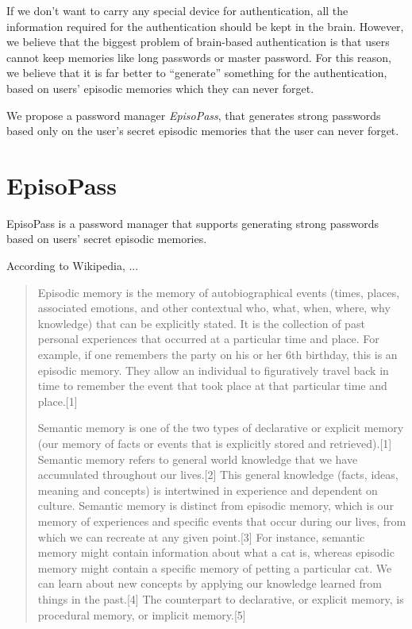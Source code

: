\documentclass{article}
\begin{document}
If we don't want to carry any special device for authentication,
all the information required for the authentication should be
kept in the brain.
%
However, we believe that the biggest problem of brain-based authentication is that
users cannot keep memories like long passwords or master password.
For this reason, we believe that
it is far better to ``generate'' something for the authentication,
based on users' episodic memories which they can never forget.


We propose a password manager \textit{EpisoPass}, that generates strong passwords
based only on the user's secret episodic memories that the user can never forget.

\section{EpisoPass}

EpisoPass is a password manager that supports generating
strong passwords based on users' secret episodic memories.
%
%

According to Wikipedia, ...

\begin{quote}
Episodic memory is the memory of autobiographical events (times,
places, associated emotions, and other contextual who, what, when,
where, why knowledge) that can be explicitly stated. It is the
collection of past personal experiences that occurred at a particular
time and place. For example, if one remembers the party on his or her
6th birthday, this is an episodic memory. They allow an individual to
figuratively travel back in time to remember the event that took place
at that particular time and place.[1]

Semantic memory is one of the two types of declarative or explicit
memory (our memory of facts or events that is explicitly stored and
retrieved).[1] Semantic memory refers to general world knowledge that
we have accumulated throughout our lives.[2] This general knowledge
(facts, ideas, meaning and concepts) is intertwined in experience and
dependent on culture. Semantic memory is distinct from episodic
memory, which is our memory of experiences and specific events that
occur during our lives, from which we can recreate at any given
point.[3] For instance, semantic memory might contain information
about what a cat is, whereas episodic memory might contain a specific
memory of petting a particular cat. We can learn about new concepts by
applying our knowledge learned from things in the past.[4] The
counterpart to declarative, or explicit memory, is procedural memory,
or implicit memory.[5]
\end{quote}
\end{document}
